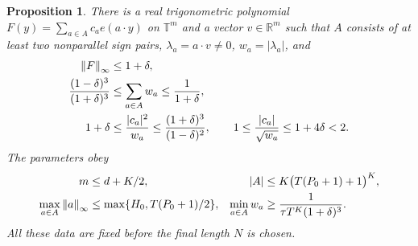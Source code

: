 \documentclass[11pt]{article}
\newtheorem{proposition}[theorem]{Proposition}
\theoremstyle{remark}
\newcommand{\R}{\mathbb R}
\newcommand{\T}{\mathbb T}
\newcommand{\norm}[1]{\left\|#1\right\|}
\begin{document}
\begin{proposition}\label{prop:auxiliary}
There is a real trigonometric polynomial
$F(y)=\sum_{a\in A}c_ae(a\cdot y)$ on $\T^m$ and a vector $v\in\R^m$
such that $A$ consists of at least two nonparallel sign pairs,
$\lambda_a=a\cdot v\ne0$, $w_a=|\lambda_a|$, and
\begin{align}
 \norm F_\infty&\le1+\delta,\notag\\
 \frac{(1-\delta)^3}{(1+\delta)^3}
 &\le\sum_{a\in A}w_a\le\frac1{1+\delta},             \label{eq:aux-conclusions}\\
 1+\delta&\le\frac{|c_a|^2}{w_a}
      \le\frac{(1+\delta)^3}{(1-\delta)^2},\qquad
 1\le\frac{|c_a|}{\sqrt{w_a}}\le1+4\delta<2.\notag
\end{align}
The parameters obey
\begin{align}
 m&\le d+K/2,& |A|&\le K\bigl(T(P_0+1)+1\bigr)^K,\notag\\
 \max_{a\in A}\norm a_\infty
 &\le\max\{H_0,T(P_0+1)/2\},&
 \min_{a\in A}w_a&\ge\frac1{\tau T^K(1+\delta)^3}.    \label{eq:aux-envelope}
\end{align}
All these data are fixed before the final length $N$ is chosen.
\end{proposition}
\end{document}

